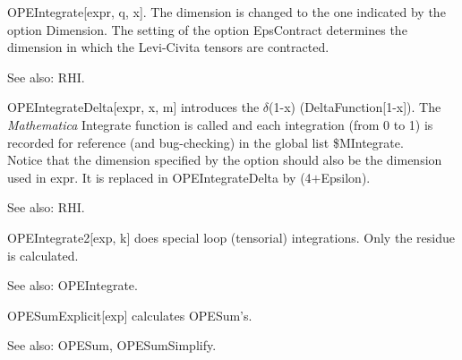 

OPEIntegrate[expr, q, x]. { }The dimension is changed to the one indicated by the option { }Dimension. The setting of the option
  EpsContract determines { }the dimension in which the Levi-Civita tensors are contracted.

See also:  RHI.





OPEIntegrateDelta[expr, x, m] introduces the \(\delta \)(1-x) (DeltaFunction[1-x]). The {\itshape Mathematica} Integrate function is called and each
integration { }(from 0 to 1) is recorded for reference (and bug-checking) in the global list
  \${}MIntegrate. \\
Notice that the dimension specified by the option should also be the dimension used in expr. It is replaced in OPEIntegrateDelta by
  (4\(+\)Epsilon).

See also:  RHI.


\dispSFinmath{
\{ \}
}



OPEIntegrate2[exp, k] does special loop (tensorial) integrations. { }Only the residue is calculated.

See also:  OPEIntegrate.





OPESumExplicit[exp] calculates OPESum's.

See also:  OPESum, OPESumSimplify.


\dispSFinmath{
\{ \}
}


\dispSFinmath{
\{ \}
}


\dispSFinmath{
\{ \}
}


\dispSFinmath{
\{ \}
}



